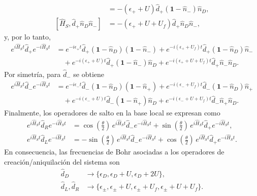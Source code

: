 \begin{appendixs}
\begin{align*}
    [\hat{H}_{S},\hat{d}_{+}(\mathbf{1}-\hat{n}_{-})\hat{n}_{D}] & = - (\epsilon_{+} + U)\hat{d}_{+}(\mathbf{1} - \hat{n}_{-})\hat{n}_{D}, \\
    [\hat{H}_{S},\hat{d}_{+}\hat{n}_{D}\hat{n}_{-}] & = - (\epsilon_{+} + U + U_{f})\hat{d}_{+}\hat{n}_{D}\hat{n}_{-},
\end{align*}
y, por lo tanto,
\begin{align*}
    e^{i \hat{H}_{S}t}\hat{d}_{+}e^{-i\hat{H}_{S}t} & =
    e^{-i\epsilon_{+}t}\hat{d}_{+}(\mathbf{1}-\hat{n}_{D})(\mathbf{1}-\hat{n}_{-})
    + e^{-i(\epsilon_{+}+U_{f})t} \hat{d}_{+}(\mathbf{1}-\hat{n}_{D})\hat{n}_{-} \\
    & \quad + e^{-i(\epsilon_{+}+U)t}\hat{d}_{+}(\mathbf{1}-\hat{n}_{-})\hat{n}_{D}
    + e^{-i(\epsilon_{+}+U+U_{f})t}\hat{d}_{+}\hat{n}_{-}\hat{n}_{D}.
\end{align*}
Por simetría, para $\hat{d}_{-}$ se obtiene
\begin{align*}
    e^{i \hat{H}_{S}t}\hat{d}_{-}e^{-i\hat{H}_{S}t} & =
    e^{-i\epsilon_{-}t}\hat{d}_{-}(\mathbf{1}-\hat{n}_{D})(\mathbf{1}-\hat{n}_{+})
    + e^{-i(\epsilon_{-}+U_{f})t} \hat{d}_{-}(\mathbf{1}-\hat{n}_{D})\hat{n}_{+} \\
    & \quad + e^{-i(\epsilon_{-}+U)t}\hat{d}_{-}(\mathbf{1}-\hat{n}_{+})\hat{n}_{D}
    + e^{-i(\epsilon_{-}+U+U_{f})t}\hat{d}_{-}\hat{n}_{+}\hat{n}_{D}.
\end{align*}
Finalmente, los operadores de salto en la base local se expresan como
\begin{align*}
    e^{i\hat{H}_{S}t}\hat{d}_{R}e^{-i\hat{H}_{S}t} & =
    \cos(\tfrac{\theta}{2})\, e^{i\hat{H}_{S}t}\hat{d}_{-}e^{-i\hat{H}_{S}t}
    + \sin(\tfrac{\theta}{2})\, e^{i\hat{H}_{S}t}\hat{d}_{+}e^{-i\hat{H}_{S}t}, \\
    e^{i\hat{H}_{S}t}\hat{d}_{L}e^{-i\hat{H}_{S}t} & =
    -\sin(\tfrac{\theta}{2})\, e^{i\hat{H}_{S}t}\hat{d}_{-}e^{-i\hat{H}_{S}t}
    + \cos(\tfrac{\theta}{2})\, e^{i\hat{H}_{S}t}\hat{d}_{+}e^{-i\hat{H}_{S}t}.
\end{align*}
En consecuencia, las frecuencias de Bohr asociadas a los operadores de creación/aniquilación del sistema son
\begin{align*}
    \hat{d}_{D} & \rightarrow \{\epsilon_{D}, \epsilon_{D}+U, \epsilon_{D}+2U\}, \\
    \hat{d}_{L}, \hat{d}_{R} & \rightarrow \{\epsilon_{\pm}, \epsilon_{\pm}+U, \epsilon_{\pm}+U_{f}, \epsilon_{\pm}+U+U_{f}\}.
\end{align*}


\end{appendixs}
